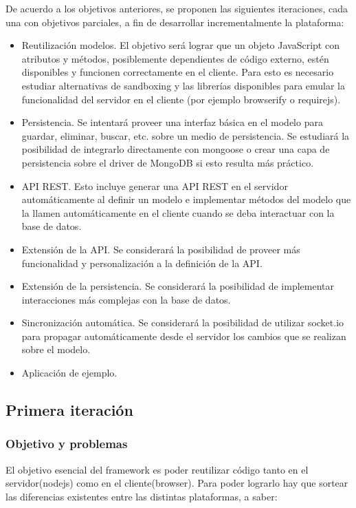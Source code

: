 \documentclass[doc,helv,longtable]{article}
\begin{document}
De acuerdo a los objetivos anteriores, se proponen las siguientes iteraciones, cada una con objetivos parciales, a fin de desarrollar incrementalmente la plataforma:
\begin{itemize}
\item  Reutilización modelos. El objetivo será lograr que un objeto JavaScript con atributos y métodos, posiblemente dependientes de código externo, estén disponibles y funcionen correctamente en el cliente. Para esto es necesario estudiar alternativas de sandboxing\cite{sandbox} y las librerías disponibles para emular la funcionalidad del servidor en el cliente (por ejemplo browserify\cite{browserify} o requirejs\cite{require}).
\item  Persistencia. Se intentará proveer una interfaz básica en el modelo para guardar, eliminar, buscar, etc. sobre un medio de persistencia. Se estudiará la posibilidad de integrarlo directamente con mongoose o crear una capa de persistencia sobre el driver de MongoDB si esto resulta más práctico.
\item  API REST. Esto incluye generar una API REST en el servidor automáticamente al definir un modelo e implementar métodos del modelo que la llamen automáticamente en el cliente cuando se deba interactuar con la base de datos.
\item  Extensión de la API. Se considerará la posibilidad de proveer más funcionalidad y personalización a la definición de la API.
\item  Extensión de la persistencia. Se considerará la posibilidad de implementar interacciones más complejas con la base de datos.
\item  Sincronización automática. Se considerará la posibilidad de utilizar socket.io para propagar automáticamente desde el servidor los cambios que se realizan sobre el modelo.
\item  Aplicación de ejemplo.

\end{itemize}
\subsection{Primera iteración}
\subsubsection{Objetivo y problemas}


El objetivo esencial del framework es poder reutilizar código tanto en el servidor(nodejs) como en el cliente(browser). Para poder lograrlo hay que sortear las diferencias existentes entre las distintas plataformas, a saber:
\end{document}
